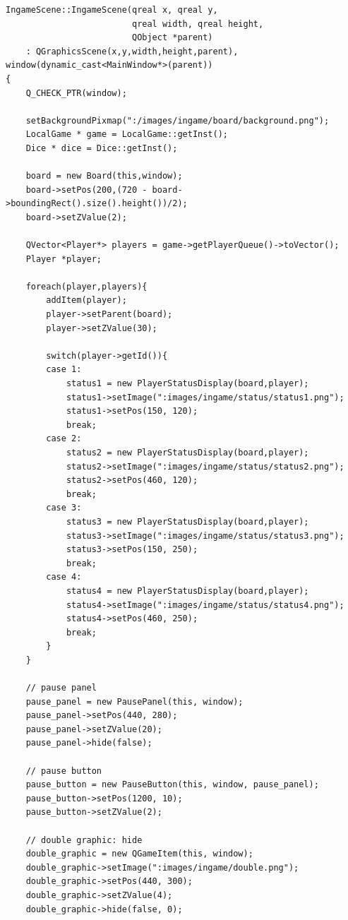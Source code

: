 \documentclass[10pt,oneside,a4paper,titlepage]{article}
\begin{document}
\begin{lstlisting}[frame=single,caption=
{Ingamescene setup},label=code:FD,captionpos=b,framexleftmargin=10pt,escapeinside=~~]
IngameScene::IngameScene(qreal x, qreal y,
                         qreal width, qreal height,
                         QObject *parent)
    : QGraphicsScene(x,y,width,height,parent), window(dynamic_cast<MainWindow*>(parent))
{
    Q_CHECK_PTR(window);

    setBackgroundPixmap(":/images/ingame/board/background.png");
    LocalGame * game = LocalGame::getInst();
    Dice * dice = Dice::getInst();

    board = new Board(this,window);
    board->setPos(200,(720 - board->boundingRect().size().height())/2);
    board->setZValue(2);

    QVector<Player*> players = game->getPlayerQueue()->toVector();
    Player *player;

    foreach(player,players){
        addItem(player);
        player->setParent(board);
        player->setZValue(30);

        switch(player->getId()){
        case 1:
            status1 = new PlayerStatusDisplay(board,player);
            status1->setImage(":images/ingame/status/status1.png");
            status1->setPos(150, 120);
            break;
        case 2:
            status2 = new PlayerStatusDisplay(board,player);
            status2->setImage(":images/ingame/status/status2.png");
            status2->setPos(460, 120);
            break;
        case 3:
            status3 = new PlayerStatusDisplay(board,player);
            status3->setImage(":images/ingame/status/status3.png");
            status3->setPos(150, 250);
            break;
        case 4:
            status4 = new PlayerStatusDisplay(board,player);
            status4->setImage(":images/ingame/status/status4.png");
            status4->setPos(460, 250);
            break;
        }
    }

    // pause panel
    pause_panel = new PausePanel(this, window);
    pause_panel->setPos(440, 280);
    pause_panel->setZValue(20);
    pause_panel->hide(false);

    // pause button
    pause_button = new PauseButton(this, window, pause_panel);
    pause_button->setPos(1200, 10);
    pause_button->setZValue(2);

    // double graphic: hide
    double_graphic = new QGameItem(this, window);
    double_graphic->setImage(":images/ingame/double.png");
    double_graphic->setPos(440, 300);
    double_graphic->setZValue(4);
    double_graphic->hide(false, 0);


\end{lstlisting}
\end{document}
